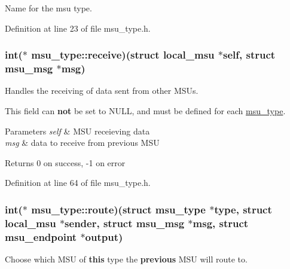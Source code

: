 Name for the msu type. 



Definition at line 23 of file msu\-\_\-type.\-h.

\hypertarget{structmsu__type_a8e80deeae69a39533061d4407fa7c53d}{
\subsubsection[{receive}]{\setlength{\rightskip}{0pt plus 5cm}int($\ast$ msu\-\_\-type\-::receive)(struct {\bf local\-\_\-msu} $\ast$self, struct {\bf msu\-\_\-msg} $\ast$msg)}}\label{structmsu__type_a8e80deeae69a39533061d4407fa7c53d}


Handles the receiving of data sent from other M\-S\-Us. 

This field can {\bfseries not} be set to N\-U\-L\-L, and must be defined for each \hyperlink{structmsu__type}{msu\-\_\-type}. 
\begin{DoxyParams}{Parameters}
{\em self} & M\-S\-U receieving data \\
\hline
{\em msg} & data to receive from previous M\-S\-U \\
\hline
\end{DoxyParams}
\begin{DoxyReturn}{Returns}
0 on success, -\/1 on error 
\end{DoxyReturn}


Definition at line 64 of file msu\-\_\-type.\-h.

\hypertarget{structmsu__type_ab076ecc00c1838c66351f51f9f2b684e}{
\subsubsection[{route}]{\setlength{\rightskip}{0pt plus 5cm}int($\ast$ msu\-\_\-type\-::route)(struct {\bf msu\-\_\-type} $\ast$type, struct {\bf local\-\_\-msu} $\ast$sender, struct {\bf msu\-\_\-msg} $\ast$msg, struct {\bf msu\-\_\-endpoint} $\ast$output)}}\label{structmsu__type_ab076ecc00c1838c66351f51f9f2b684e}


Choose which M\-S\-U of {\bfseries this} type the {\bfseries previous} M\-S\-U will route to. 

